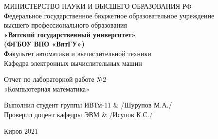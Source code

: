 \thispagestyle{empty}
\begin{center}
    МИНИСТЕРСТВО НАУКИ И ВЫСШЕГО ОБРАЗОВАНИЯ РФ\\
    Федеральное государственное бюджетное образовательное учреждение\\
    высшего профессионального образования\\
    {\bf«Вятский государственный университет»}\\
    {\bf(ФГБОУ ВПО «ВятГУ»)}\\
    Факультет автоматики и вычислительной техники\\
    Кафедра электронных вычислительных машин
\end{center}
\vfill %
\begin{center}
    Отчет по лабораторной работе №2\\
    «Компьютерная математика»
\end{center}

\vfill
\begin{flushleft}
    Выполнил студент группы ИВТм-11 & \hrulefill /Шурупов М.А./\\
    Проверил доцент кафедры ЭВМ & \hrulefill  /Исупов К.С./
\end{flushleft}
\vfill %

\begin{center}
    Киров 2021
\end{center}
\newpage